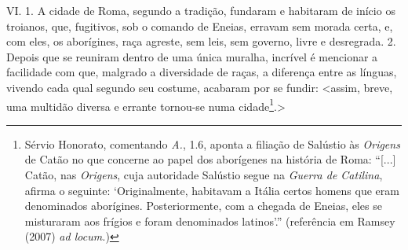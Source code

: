VI. 1. A cidade de Roma, segundo a tradição, fundaram e habitaram de início os
troianos, que, fugitivos, sob o comando de Eneias, erravam sem morada certa, e,
com eles, os aborígines, raça agreste, sem leis, sem governo, livre e
desregrada. 2. Depois que se reuniram dentro de uma única muralha, incrível é
mencionar a facilidade com que, malgrado a diversidade de raças, a diferença
entre as línguas, vivendo cada qual segundo seu costume, acabaram por se
fundir: \textless assim, breve, uma multidão diversa e errante tornou-se numa
cidade\footnote{Sérvio Honorato, comentando \emph{A.}, 1.6, aponta a
filiação de Salústio às \emph{Origens} de Catão no que concerne ao papel dos
aborígenes na história de Roma: ``[...] Catão, nas \emph{Origens}, cuja
autoridade Salústio segue na \emph{Guerra de Catilina}, afirma o seguinte:
`Originalmente, habitavam a Itália certos homens que eram denominados
aborígines. Posteriormente, com a chegada de Eneias, eles se misturaram aos
frígios e foram denominados latinos'.'' (referência em Ramsey (2007) \emph{ad
locum.})}.\textgreater

